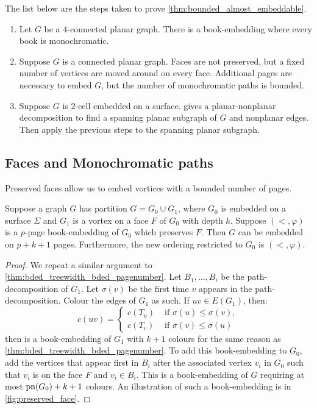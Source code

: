 The list below are the steps taken to prove \cref{thm:bounded_almost_embeddable}.
\begin{enumerate}
	\item Let $G$ be a \(4\)-connected planar graph. There is a book-embedding where every book is monochromatic. 
	\item Suppose \(G\) is a connected planar graph. Faces are not preserved, but a fixed number of vertices are moved around on every face. Additional pages are necessary to embed $G$, but the number of monochromatic paths is bounded. 
	\item Suppose \(G\) is $2$-cell embedded on a surface. \textcite{heathPagenumberGenusGraphs1992} gives a planar-nonplanar decomposition to find a spanning planar subgraph of $G$ and nonplanar edges. Then apply the previous steps to the spanning planar subgraph.
\end{enumerate}

\subsection{Faces and Monochromatic paths}

Preserved faces allow us to embed vortices with a bounded number of pages. 

\begin{lemma}\label{lem:preserved_faces_pagenumber}
	Suppose a graph \(G\) has partition \(G = G_0 \cup G_1\), where \(G_0\) is embedded on a surface $\Sigma$ and \(G_1\) is a vortex on a face $F$ of $G_0$ with depth \(k\). Suppose $(<, \varphi)$ is a $p$-page book-embedding of \(G_0\) which preserves \(F\). Then $G$ can be embedded on \(p + k + 1\) pages. Furthermore, the new ordering restricted to $G_0$ is $(<, \varphi)$.
\end{lemma}

\begin{proof}
	We repeat a similar argument to \cref{thm:bded_treewidth_bded_pagenumber}. Let \(B_1, \ldots, B_i\) be the path-decomposition of \(G_1\). Let \(\sigma(v)\) be the first time \(v\) appears in the path-decomposition. Colour the edges of \(G_1\) as such. If \(uv \in E(G_1)\), then:
	\begin{equation}
		c(uv) =
		\begin{cases}
			c(T_u) & \text{ if } \sigma(u) \leq \sigma(v), \\
			c(T_v) & \text{ if } \sigma(v) \leq \sigma(u)
		\end{cases}
	\end{equation}
	then is a book-embedding of \(G_1\) with \(k+1\) colours for the same reason as \cref{thm:bded_treewidth_bded_pagenumber}.
	To add this book-embedding to \(G_0\), add the vertices that appear first in \(B_i\) after the associated vertex \(v_i\) in \(G_0\) such that \(v_i\) is on the face \(F\) and \(v_i \in B_i\). This is a book-embedding of \(G\) requiring at most \(\operatorname{pn}(G_0) + k + 1\) colours. An illustration of such a book-embedding is in \cref{fig:preserved_face}.
\end{proof}

